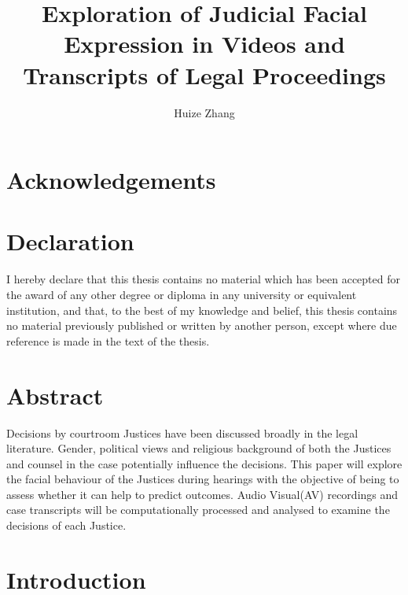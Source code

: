 \documentclass{monashthesis}
\author{Huize Zhang}
\title{Exploration of Judicial Facial Expression in Videos and Transcripts of Legal Proceedings}
\begin{document}

\titlepage

{\sf\tighttoc\doublespacing}

\clearpage{}\setcounter{page}{0}

\hypertarget{acknowledgements}{%
\chapter*{Acknowledgements}\label{acknowledgements}}

\hypertarget{declaration}{%
\chapter*{Declaration}\label{declaration}}

I hereby declare that this thesis contains no material which has been accepted for the award of any other degree or diploma in any university or equivalent institution, and that, to the best of my knowledge and belief, this thesis contains no material previously published or written by another person, except where due reference is made in the text of the thesis.

\vspace*{2cm}\par\authorname

\hypertarget{abstract}{%
\chapter*{Abstract}\label{abstract}}

Decisions by courtroom Justices have been discussed broadly in the legal literature. Gender, political views and religious background of both the Justices and counsel in the case potentially influence the decisions. This paper will explore the facial behaviour of the Justices during hearings with the objective of being to assess whether it can help to predict outcomes. Audio Visual(AV) recordings and case transcripts will be computationally processed and analysed to examine the decisions of each Justice.

\clearpage{}\setcounter{page}{1}

\hypertarget{ch:intro}{%
\chapter{Introduction}\label{ch:intro}}
\end{document}
